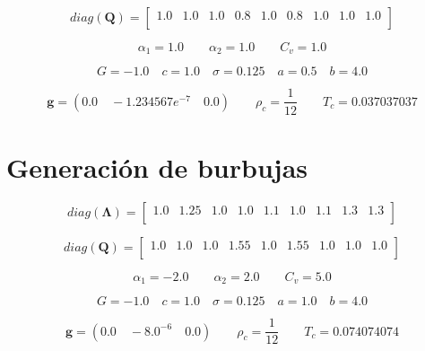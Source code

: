 \begin{equation}
diag(\mathbf{Q}) = 
	\begin{bmatrix}
		1.0 & 1.0 & 1.0 & 0.8 & 1.0 & 0.8 & 1.0 & 1.0 & 1.0 \\
	\end{bmatrix}
\end{equation}

\begin{equation}
	\alpha_{1} = 1.0 \qquad 	\alpha_{2} = 1.0 \qquad C_{v} = 1.0
\end{equation}

\begin{equation}
	G = -1.0 \quad c = 1.0 \quad \sigma = 0.125 \quad a = 0.5 \quad b = 4.0 
\end{equation}

\begin{equation}
\mathbf{g} = (0.0 \quad-1.234567e^{-7}\quad 0.0 ) \qquad \rho_c = \frac{1}{12} \qquad T_c = 0.037037037
\end{equation}

\section{Generación de burbujas}
\label{parametros_bub}

\begin{equation}
	diag(\mathbf{\Lambda}) = 
		\begin{bmatrix}
			1.0 & 1.25 & 1.0 & 1.0 & 1.1 & 1.0 & 1.1 & 1.3 & 1.3 \\
		\end{bmatrix}
\end{equation}

\begin{equation}
diag(\mathbf{Q}) = 
\begin{bmatrix}
1.0 & 1.0 & 1.0 & 1.55 & 1.0 & 1.55 & 1.0 & 1.0 & 1.0 \\
\end{bmatrix}
\end{equation}

\begin{equation}
\alpha_{1} = -2.0 \qquad 	\alpha_{2} = 2.0 \qquad C_{v} = 5.0
\end{equation}


\begin{equation}
G = -1.0 \quad c = 1.0 \quad \sigma = 0.125 \quad a = 1.0 \quad b = 4.0 
\end{equation}

\begin{equation}
\mathbf{g} = (0.0 \quad -8.0^{-6} \quad 0.0 ) \qquad \rho_c = \frac{1}{12} \qquad T_c = 0.074074074
\end{equation}